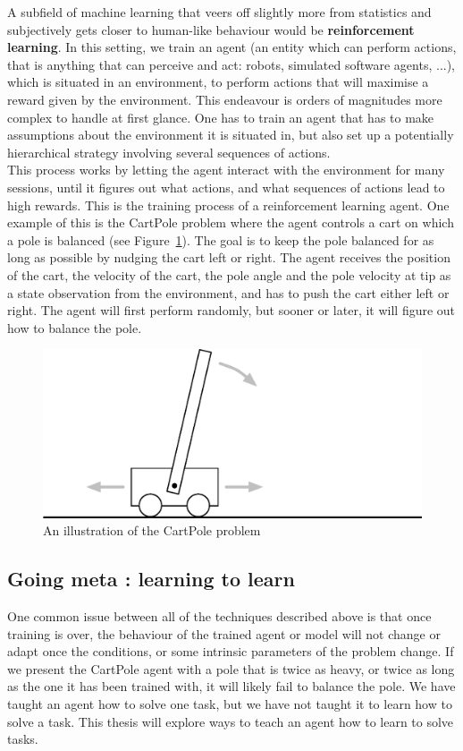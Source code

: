 A subfield of machine learning that veers off slightly more
from statistics and subjectively gets closer to human-like behaviour
would be \textbf{reinforcement learning}. In this setting, we train an agent
(an entity which can perform actions, that is anything that can perceive and
act: robots, simulated software agents, ...), 
which is situated in an environment, to perform actions that will maximise
a reward given by the environment. This endeavour is orders of magnitudes more
complex to handle at first glance. One has to train an agent that has to make
assumptions about the environment it is situated in, but also set up a
potentially hierarchical strategy involving several sequences of actions.\\

This process works by letting the agent interact with the environment for many
sessions, until it figures out what actions, and what sequences of actions lead
to high rewards. This is the training process of a reinforcement learning agent.
One example of this is the CartPole problem \cite{barto-cartpole} where the
agent controls a cart on which a pole is balanced (see
Figure~\ref{fig:cartpole_illustration}). The goal is to keep the
pole balanced for as long as possible by nudging the cart left or right. The
agent receives the position of the cart, the velocity of the cart, the pole
angle and the pole velocity at tip as a state observation from the environment,
and has to push the cart either left or right. The agent will first perform
randomly, but sooner or later, it will figure out how to balance the pole.\\

\begin{figure}
	\centering
	\includegraphics[width=0.8\linewidth]{fig/cartpole.eps}
	\caption{An illustration of the CartPole problem}
	\label{fig:cartpole_illustration}
\end{figure}

\subsection{Going meta : learning to learn}
One common issue between all of the techniques described above is that once
training is over, the behaviour of the trained agent or model will not change
or adapt once the conditions, or some intrinsic parameters of the problem
change. If we present the CartPole agent with a pole that is twice as heavy,
or twice as long as the one it has been trained with, it will likely fail to 
balance the pole. We have taught an agent how to solve one task, but we have
not taught it to learn how to solve a task. This thesis will explore ways to 
teach an agent how to learn to solve tasks.\\

